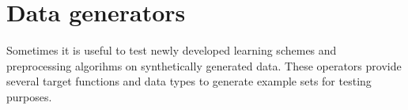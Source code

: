 \section{Data generators}

Sometimes it is useful to test newly developed learning schemes and
preprocessing algorihms on synthetically generated data. These operators
provide several target functions and data types to generate example sets for
testing purposes.
